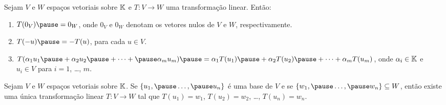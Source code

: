 \documentclass{beamer}
\begin{document}
\begin{frame}
    \begin{lema}
        Sejam $V$ e $W$ espaços vetoriais sobre $\mathbb{K}$ \pause e $T : V \to W$ uma transformação linear. \pause Então:\pause
        \begin{enumerate}[label={\roman*})]\label{transformacao_linear_propriedades_basicas}
            \item $T(0_V) \pause = 0_W$, \pause onde $0_V$ e $0_W$ \pause denotam os vetores nulos de $V$ e $W$, respectivamente.\pause

            \vspace*{1cm}

            \item $T(-u) \pause = -T(u)$, \pause para cada $u \in V$.\pause

            \vspace{1cm}

            \item $T(\alpha_1u_1 \pause + \alpha_2u_2 \pause + \cdots + \pause \alpha_mu_m) \pause = \alpha_1 T(u_1) \pause + \alpha_2 T(u_2) \pause + \cdots + \alpha_m T(u_m)$, \pause onde $\alpha_i \in \mathbb{K}$ e $u_i \in V$ para $i = 1$, \dots, $m$.
        \end{enumerate}
    \end{lema}
\end{frame}

\begin{frame}
    \begin{teorema}\label{existencia_de_transformacao_unica_dado_valores}
        Sejam $V$ e $W$ espaços vetoriais sobre $\mathbb{K}$. \pause Se $\{u_1, \pause \dots, \pause u_n\}$ \pause é uma base de $V$ \pause e se $\{w_1, \pause \dots, \pause w_n\} \subseteq W$, \pause então existe uma única transformação linear \pause $T : V \to W$ \pause tal que $T(u_1) = w_1$, \pause $T(u_2) = w_2$, \pause \dots, $T(u_n) = w_n$.
    \end{teorema}
\end{frame}
\end{document}
